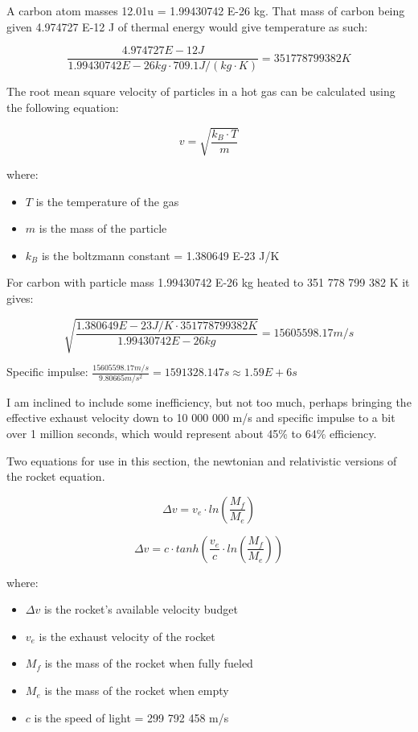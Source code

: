 \documentclass[a4paper]{article}
\begin{document}
    \medskip
    
    A carbon atom masses 12.01u = 1.99430742 E-26 kg.
    That mass of carbon being given 4.974727 E-12 J of thermal energy would give temperature as such:
    
    $$ \frac{4.974727 E-12 J}{1.99430742 E-26 kg \cdot 709.1 J/(kg·K)} = 351778799382 K $$
    
    \medskip
    
    The root mean square velocity of particles in a hot gas can be calculated using the following equation:
    
    $$ v = \sqrt{\frac{k_B \cdot T}{m}} $$
    
    where:
    
    \begin{itemize}
    	\item $T$ is the temperature of the gas
    	
    	\item $m$ is the mass of the particle
    	
    	\item $k_B$ is the boltzmann constant = 1.380649 E-23 J/K
    \end{itemize}
    
    For carbon with particle mass 1.99430742 E-26 kg heated to 351 778 799 382 K it gives:
    
    $$ \sqrt{\frac{1.380649 E-23 J/K \cdot 351778799382 K}{1.99430742 E-26 kg}} = 15605598.17 m/s $$
    
    Specific impulse: $\frac{15605598.17 m/s}{9.80665 m/s^2} = 1591328.147 s \approx 1.59 E+6 s$
    
    \medskip
    
    I am inclined to include some inefficiency, but not too much, perhaps bringing the effective exhaust velocity down to 10 000 000 m/s and specific impulse to a bit over 1 million seconds, which would represent about 45\% to 64\% efficiency.
    
    \pagebreak
    
    Two equations for use in this section, the newtonian and relativistic versions of the rocket equation.
    
    $$ \Delta v = v_e \cdot ln(\frac{M_f}{M_e}) $$
    
    $$ \Delta v = c \cdot tanh\left( \frac{v_e}{c} \cdot ln(\frac{M_f}{M_e}) \right) $$
    
    where:
    
    \begin{itemize}
    	\item $\Delta v$ is the rocket's available velocity budget
    	
    	\item $v_e$ is the exhaust velocity of the rocket
    	
    	\item $M_f$ is the mass of the rocket when fully fueled
    	
    	\item $M_e$ is the mass of the rocket when empty
    	
    	\item $c$ is the speed of light = 299 792 458 m/s
    \end{itemize}
    
\end{document}
